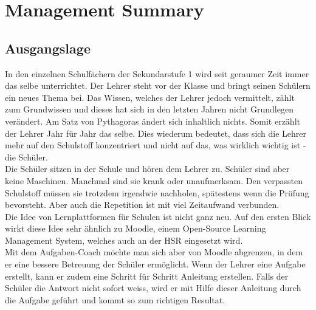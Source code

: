 \section*{Management Summary}

\subsection*{Ausgangslage}
In den einzelnen Schulfächern der Sekundarstufe 1 wird seit geraumer Zeit immer das selbe unterrichtet. Der Lehrer steht vor der Klasse und bringt seinen Schülern ein neues Thema bei. Das Wissen, welches der Lehrer jedoch vermittelt, zählt zum Grundwissen und dieses hat sich in den letzten Jahren nicht Grundlegen verändert. Am Satz von Pythagoras ändert sich inhaltlich nichts. Somit erzählt der Lehrer Jahr für Jahr das selbe. Dies wiederum bedeutet, dass sich die Lehrer mehr auf den Schulstoff konzentriert und nicht auf das, was wirklich wichtig ist - die Schüler. \\

\noindent Die Schüler sitzen in der Schule und hören dem Lehrer zu. Schüler sind aber keine Maschinen. Manchmal sind sie krank oder unaufmerksam. Den verpassten Schulstoff müssen sie trotzdem irgendwie nachholen, spätestens wenn die Prüfung bevorsteht. Aber auch die Repetition ist mit viel Zeitaufwand verbunden. \\

\noindent Die Idee von Lernplattformen für Schulen ist nicht ganz neu. Auf den ersten Blick wirkt diese Idee sehr ähnlich zu Moodle, einem Open-Source Learning Management System, welches auch an der HSR eingesetzt wird. \\

\noindent Mit dem Aufgaben-Coach möchte man sich aber von Moodle abgrenzen, in dem er eine bessere Betreuung der Schüler ermöglicht. Wenn der Lehrer eine Aufgabe erstellt, kann er zudem eine Schritt für Schritt Anleitung erstellen. Falls der Schüler die Antwort nicht sofort weiss, wird er mit Hilfe dieser Anleitung durch die Aufgabe geführt und kommt so zum richtigen Resultat. 


